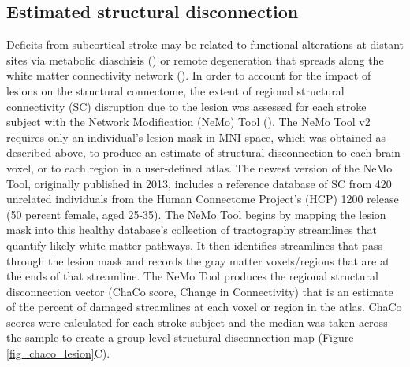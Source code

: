 \documentclass[phd,tocprelim]{cornell}
\begin{document}
	\subsection*{Estimated structural disconnection}
	Deficits from subcortical stroke may be related to functional alterations at distant sites via metabolic diaschisis (\cite{Hillis2002-dz, Corbetta2015-ez}) or remote degeneration that spreads along the white matter connectivity network (\cite{Duering2015-iv, Cheng2015-jq}). In order to account for the impact of lesions on the structural connectome, the extent of regional structural connectivity (SC) disruption due to the lesion was assessed for each stroke subject with the Network Modification (NeMo) Tool (\cite{Kuceyeski2013-nk}). The NeMo Tool v2 requires only an individual’s lesion mask in MNI space, which was obtained as described above, to produce an estimate of structural disconnection to each brain voxel, or to each region in a user-defined atlas. The newest version of the NeMo Tool, originally published in 2013, includes a reference database of SC from 420 unrelated individuals from the Human Connectome Project’s (HCP) 1200 release (50 percent female, aged 25-35). The NeMo Tool begins by mapping the lesion mask into this healthy database’s collection of tractography streamlines that quantify likely white matter pathways. It then identifies streamlines that pass through the lesion mask and records the gray matter voxels/regions that are at the ends of that streamline. The NeMo Tool produces the regional structural disconnection vector (ChaCo score, Change in Connectivity) that is an estimate of the percent of damaged streamlines at each voxel or region in the atlas. ChaCo scores were calculated for each stroke subject and the median was taken across the sample to create a group-level structural disconnection map (Figure \ref{fig_chaco_lesion}C).
	
\end{document}
